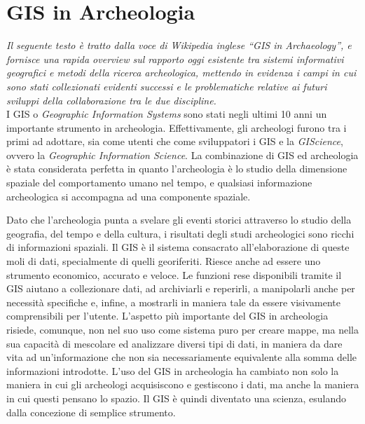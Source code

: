 \chapter{GIS in Archeologia}

\emph{Il seguente testo è tratto dalla voce di Wikipedia inglese ``GIS in Archaeology''\cite{wiki:xxx}, e fornisce una rapida overview sul rapporto oggi esistente tra sistemi informativi geografici e metodi della ricerca archeologica, mettendo in evidenza i campi in cui sono stati collezionati evidenti successi e le problematiche relative ai futuri sviluppi della collaborazione tra le due discipline.}\\

I GIS o \emph{Geographic Information Systems} sono stati negli ultimi 10 anni un importante strumento in archeologia. Effettivamente, gli archeologi furono tra i primi ad adottare, sia come utenti che come sviluppatori i GIS e la \emph{GIScience}, ovvero la \emph{Geographic Information Science}. La combinazione di GIS ed archeologia è stata considerata perfetta in quanto l'archeologia è lo studio della dimensione spaziale del comportamento umano nel tempo, e qualsiasi informazione archeologica si accompagna ad una componente spaziale.

Dato che l'archeologia punta a svelare gli eventi storici attraverso lo studio della geografia, del tempo e della cultura, i risultati degli studi archeologici sono ricchi di informazioni spaziali. Il GIS è il sistema consacrato all'elaborazione di queste moli di dati, specialmente di quelli georiferiti. Riesce anche ad essere uno strumento economico, accurato e veloce. Le funzioni rese disponibili tramite il GIS aiutano a collezionare dati, ad archiviarli e reperirli, a manipolarli anche per necessità specifiche e, infine, a mostrarli in maniera tale da essere visivamente comprensibili per l'utente.  L'aspetto più importante del GIS in archeologia risiede, comunque, non nel suo uso come sistema puro per creare mappe, ma nella sua capacità di mescolare ed analizzare diversi tipi di dati, in maniera da dare vita ad un'informazione
che non sia necessariamente equivalente alla somma delle informazioni introdotte. L'uso del GIS in archeologia ha cambiato non solo la maniera in cui gli archeologi acquisiscono e gestiscono i dati, ma anche la maniera in cui questi pensano lo spazio. Il GIS è quindi diventato una scienza, esulando dalla concezione di semplice strumento.


